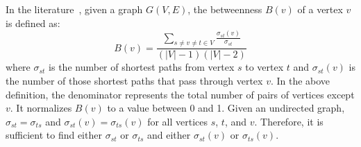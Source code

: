\documentclass[journal]{IEEEtran}
\newcommand{\EN}[1]{\mathcal{E}_{{#1}}}
\newcommand{\XN}[1]{\mathcal{X}_{{#1}}}
\newcommand{\B}[1]{B({#1})}
\theoremstyle{definition}
\begin{document}
In the literature~\cite{centrality, everett, Brandes01afaster}, given a graph $G(V, E)$, the betweenness $\B{v}$ of a vertex $v$ is defined as:
\begin{equation}\label{bet}
\B{v} = \frac{\sum_{s \neq v \neq t \in V}\frac{\sigma_{st}(v)}{\sigma_{st}}}{(|V|-1)(|V|-2)}
\end{equation} where $\sigma_{st}$ is the number of shortest paths from vertex $s$ to vertex $t$ and $\sigma_{st}(v)$ is the number of those shortest paths that pass through vertex $v$. 
In the above definition, the denominator represents the total number of pairs of vertices except $v$.
It normalizes $\B{v}$ to a value between 0 and 1.
Given an undirected graph, $\sigma_{st}=\sigma_{ts}$ and $\sigma_{st}(v)=\sigma_{ts}(v)$ for all vertices $s$, $t$, and $v$.
Therefore, it is sufficient to find either $\sigma_{st}$ or $\sigma_{ts}$ and either $\sigma_{st}(v)$ or $\sigma_{ts}(v)$.

% 
\end{document}
